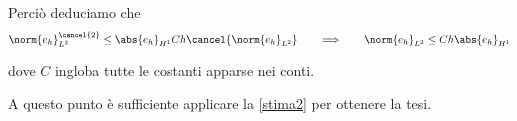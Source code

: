 Perciò deduciamo che 
\begin{equation*}
\norm{e_h}^{\cancel{2}}_{L^2}\leq \abs{e_h}_{H^1} C h \cancel{\norm{e_h}_{L^2}} \qquad \Longrightarrow \qquad \norm{e_h}_{L^2}\leq C h \abs{e_h}_{H^1}
\end{equation*}

dove $C$ ingloba tutte le costanti apparse nei conti.

A questo punto è sufficiente applicare la \eqref{stima2} per ottenere la tesi.





































